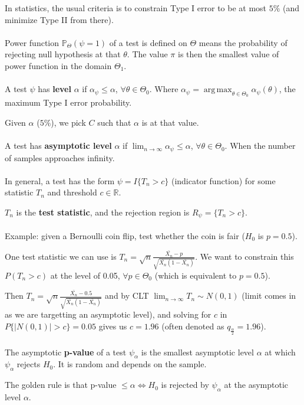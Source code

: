 \documentclass{article}
\DeclareMathOperator*{\argmax}{arg\,max}
\begin{document}
In statistics, the usual criteria is to constrain Type I error to be at most $5\%$ (and minimize Type II from there).
\\
\\
Power function $\mathbb{P}_{\Theta}(\psi = 1)$ of a test is defined on $\Theta$ means the probability of rejecting null hypothesis at that $\theta$.
The value $\pi$ is then the smallest value of power function in the domain $\Theta_1$.
\\
\\
A test $\psi$ has \textbf{level} $\alpha$ if $\alpha_{\psi} \leq \alpha$, $\forall \theta \in \Theta_0$.
Where $\alpha_{\psi} = \argmax_{\theta \in \Theta_0} \alpha_{\psi}(\theta)$, the maximum Type I error probability.

Given $\alpha$ ($5\%$), we pick $C$ such that $\alpha$ is at that value.
\\
\\
A test has \textbf{asymptotic level} $\alpha$ if $\lim_{n \to \infty} \alpha_{\psi} \leq \alpha$, $\forall \theta \in \Theta_0$.
When the number of samples approaches infinity.
\\
\\
In general, a test has the form $\psi = I\{T_n > c\}$ (indicator function) for some statistic $T_n$ and threshold $c \in \mathbb{R}$.

$T_n$ is the \textbf{test statistic}, and the rejection region is $R_{\psi} = \{T_n > c\}$.
\\
\\
Example: given a Bernoulli coin flip, test whether the coin is fair ($H_0$ is $p = 0.5$).

One test statistic we can use is $T_n = \sqrt{n} \frac{\bar{X_n} - p}{\sqrt{\bar{X_n} (1 - \bar{X_n})}}$. We want to constrain this $P(T_n > c)$ at the level of 0.05, $\forall p \in \Theta_0$ (which is equivalent to $p = 0.5$).

Then $T_n = \sqrt{n} \frac{\bar{X_n} - 0.5}{\sqrt{\bar{X_n} (1 - \bar{X_n})}}$ and by CLT $\lim_{n \to \infty} T_n \sim N(0, 1)$ (limit comes in as we are targetting an asymptotic level), and solving for $c$ in $P\{|N(0, 1)| > c\} = 0.05$ gives us $c = 1.96$ (often denoted as $q_{\frac{\alpha}{2}} = 1.96$).
\\
\\
The asymptotic \textbf{p-value} of a test $\psi_{\alpha}$ is the smallest asymptotic level $\alpha$ at which $\psi_{\alpha}$ rejects $H_0$.
It is random and depends on the sample.

The golden rule is that p-value $\leq \alpha \iff H_0$ is rejected by $\psi_{\alpha}$ at the asymptotic level $\alpha$.
\end{document}
